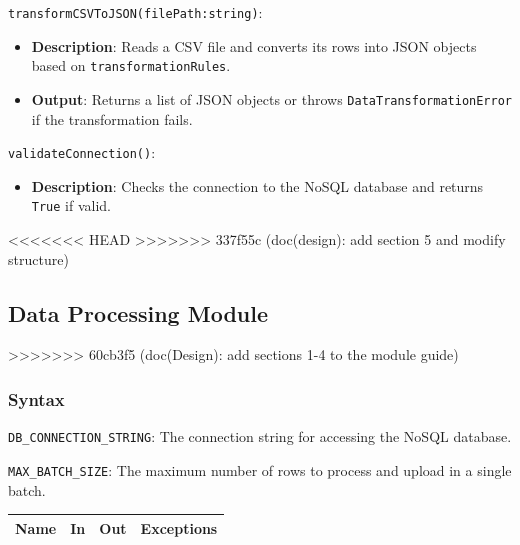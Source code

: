 \documentclass[12pt, titlepage]{article}
\begin{document}
\begin{description}
\begin{description}
  \item[Local Function:] 
  \item
  \texttt{transformCSVToJSON(filePath:string)}:
  \item
  \begin{itemize}
    \item \textbf{Description}: Reads a CSV file and converts its rows into JSON objects based on
    \texttt{transformationRules}.
  \end{itemize}
  \item 
  \begin{itemize}
    \item \textbf{Output}: Returns a list of JSON objects or throws \texttt{DataTransformationError}
    if the transformation fails.
  \end{itemize}
  \item 
  \texttt{validateConnection()}:
  \item 
  \begin{itemize}
    \item \textbf{Description}: Checks the connection to the NoSQL database and returns \texttt{True}
    if valid.
  \end{itemize}
\end{description}

<<<<<<< HEAD
>>>>>>> 337f55c (doc(design): add section 5 and modify structure)
\subsection{Data Processing Module}
>>>>>>> 60cb3f5 (doc(Design): add sections 1-4 to the module guide)

\subsubsection{Syntax}
\begin{description}
  \item[Exported Constants and Access Programs:]
  \item 
  \texttt{DB\_CONNECTION\_STRING}: The connection string for accessing the
    NoSQL database.
  \item
  \texttt{MAX\_BATCH\_SIZE}: The maximum number of rows to process and upload
  in a single batch.

  \begin{table}[h!]
    \centering
    \begin{tabular}{p{} p{} p{} p{}}
    \toprule
    \textbf{Name} & \textbf{In} & \textbf{Out} & \textbf{Exceptions}\\
    \midrule
    

\end{tabular}
\end{table}
\end{description}
\end{description}
\end{document}
